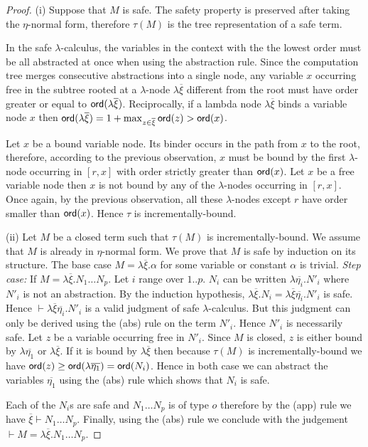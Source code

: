 \begin{proof}
(i) Suppose that $M$ is safe. The safety property is preserved after
taking the $\eta$-normal form, therefore $\tau(M)$ is the tree representation of a safe term.

In the safe $\lambda$-calculus, the variables in the context with the the lowest order must be all abstracted 
at once when using the abstraction rule. Since the computation
tree merges consecutive abstractions into a single node,
any variable $x$ occurring free in the subtree rooted at a $\lambda$-node $\lambda \overline{\xi}$ different from the root
must have order greater or equal to ${\sf ord}(\lambda \overline{\xi})$. Reciprocally, if a lambda node
$\lambda \overline{\xi}$ binds a variable node $x$ then
${\sf ord}(\lambda \overline{\xi}) = 1+\max_{z\in\overline{\xi}} {\sf ord}(z) > {\sf ord}(x)$.

Let $x$ be a bound variable node. Its binder occurs in the path from $x$ 
to the root, therefore, according to the previous observation, $x$ must be bound
by the first $\lambda$-node occurring in $[r,x]$ with order strictly
greater than ${\sf ord}(x)$. Let $x$ be a free variable node then $x$ is not bound 
by any of the $\lambda$-nodes occurring in $[r,x]$. Once again, by the previous observation, all
these $\lambda$-nodes except $r$ have order smaller than ${\sf ord}(x)$. Hence
$\tau$ is incrementally-bound.

(ii) Let $M$ be a closed term such that $\tau(M)$ is incrementally-bound.
We assume that $M$ is already in $\eta$-normal form.
We prove that $M$ is safe by induction on its structure. The base case $M =
\lambda \overline{\xi} . \alpha$ for some variable or constant
$\alpha$ is trivial.
\emph{Step case:} If $M = \lambda \overline{\xi} . N_1 \ldots N_p$.
Let $i$ range over $1..p$. $N_i$ can be written $\lambda
\overline{\eta_i} . N'_i$ where $N'_i$ is not an abstraction. By the
induction hypothesis, $\lambda \overline{\xi} . N_i = \lambda
\overline{\xi} \overline{\eta_i} . N'_i$ is safe. 
Hence $\vdash \lambda \overline{\xi} \overline{\eta_i} . N'_i$
is a valid judgment of safe $\lambda$-calculus. 
But this judgment can only be derived using the (abs) rule on the term $N'_i$. Hence
$N'_i$ is necessarily safe. Let $z$ be a variable occurring free in
$N'_i$. Since $M$ is closed, $z$ is either bound by $\lambda
\overline{\eta_1}$ or $\lambda \overline{\xi}$. If it is bound by
$\lambda \overline{\xi}$ then because $\tau(M)$ is
incrementally-bound we have ${\sf ord}(z) \geq {\sf ord}(\lambda
\overline{\eta_1}) = {\sf ord}(N_i)$. Hence in both case we can abstract the variables
$\overline{\eta_1}$ using the (abs) rule which shows that $N_i$ is safe.

Each of the $N_i$s are safe and $N_1 \ldots N_p$ is of type $o$ therefore 
by the (app) rule we have $\overline{\xi} \vdash N_1 \ldots N_p$. Finally, using the (abs) rule we conclude 
with the judgement $\vdash M = \lambda \overline{\xi} . N_1 \ldots N_p$.
\end{proof}


